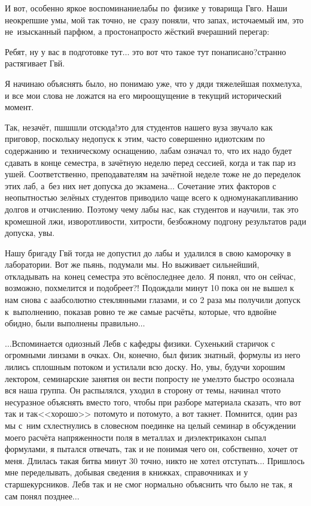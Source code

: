И вот, особенно яркое воспоминание\mdash лабы по~физике у товарища Гв\sdash го. Наши неокрепшие умы, мой так точно, не~сразу поняли, что запах, источаемый им, это не~изысканный парфюм, а просто\sdash напросто жёсткий вчерашний перегар:

\diagdash Ребят, ну у вас в подготовке тут$\ldots$ это вот что такое тут понаписано?\mdash странно растягивает Гв\sdash й.

Я начинаю объяснять было, но понимаю уже, что у дяди тяжелейшая похмелуха, и все мои слова не ложатся на его мироощущение в текущий исторический момент.

\diagdash Так, незачёт, пш\sdash ш\sdash шли отсюда!\mdash это для студентов нашего вуза звучало как приговор, поскольку недопуск к этим, часто совершенно идиотским по содержанию и~техническому оснащению, лабам означал то, что их надо будет сдавать в конце семестра, в зачётную неделю перед сессией, когда и так пар из ушей. Соответственно, преподавателям на зачётной неделе тоже не до переделок этих лаб, а~без них нет допуска до экзамена$\ldots$ Сочетание этих факторов с неопытностью зелёных студентов приводило чаще всего к одному\mdash накапливанию долгов и отчислению. Поэтому чему лабы нас, как студентов и научили, так это кромешной лжи, изворотливости, хитрости, безбожному подгону результатов ради допуска, увы.

Нашу бригаду Гв\sdash й тогда не допустил до лабы и~удалился в свою каморочку в лаборатории. Вот же пьянь, подумали мы. Но выживает сильнейший, откладывать на~конец семестра это всё\mdash последнее дело. Я понял, что он сейчас, возможно, похмелится и подобреет?! Подождали минут 10 пока он не вышел к нам снова с а\sdash а\sdash абсолютно стеклянными глазами, и со 2 раза мы получили допуск к~выполнению, показав ровно те же самые расчёты, которые, что вдвойне обидно, были выполнены правильно$\ldots$

$\ldots$Вспоминается одиозный Леб\sdash в с кафедры физики. Сухенький старичок с огромными линзами в очках. Он, конечно, был физик знатный, формулы из него лились сплошным потоком и устилали всю доску. Но, увы, будучи хорошим лектором, семинарские занятия он вести попросту не умел\mdash это быстро осознала вся наша группа. Он распылялся, уходил в сторону от темы, начинал что\sdash то несуразное объяснять вместо того, чтобы при разборе материала сказать, что вот так и так\mdash <<хорошо>> потому\sdash то и потому\sdash то, а вот так\mdash нет. Помнится, один раз мы с~ним схлестнулись в словесном поединке на целый семинар в обсуждении моего расчёта напряженности поля в металлах и диэлектриках\mdash он сыпал формулами, я пытался отвечать, так и не понимая чего он, собственно, хочет от меня. Длилась такая битва минут 30 точно, никто не хотел отступать$\ldots$ Пришлось мне переделывать, добывая сведения в книжках, справочниках и у старшекурсников. Леб\sdash в так и не смог нормально объяснить что было не так, я сам понял позднее$\ldots$

\begin{center}
\end{center}